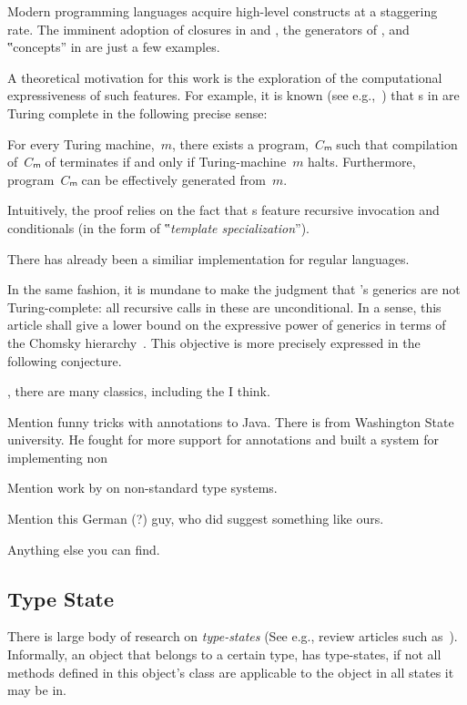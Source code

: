 Modern programming languages acquire high-level constructs
  at a staggering rate.
The imminent adoption of closures in \Java and \CC,
  the generators of \CSharp, and ‟concepts” in
  \CC are just a few examples.

A theoretical motivation for this work
  is the exploration of the computational
  expressiveness of such features.
For example, it is known (see e.g.,~\cite{Gutterman:2003}) that
  s in \CC are Turing complete in the following precise sense:

\begin{Theorem}
  \label{Theorem:Gutterman}
  For every Turing machine,~$m$, there exists a \CC program,~$Cₘ$ such that
    compilation of~$Cₘ$ of terminates if and only if
      Turing-machine~$m$ halts.
  Furthermore, program~$Cₘ$ can be effectively generated from~$m$.
\end{Theorem}

Intuitively, the proof relies on the fact that s
  feature recursive invocation and conditionals (in the form of
  ‟\emph{template specialization}”).

There has already been a similiar \Java implementation for regular
  languages.
  
In the same fashion, it is mundane to make the judgment that
  \Java's generics are not Turing-complete: all recursive calls
  in these are unconditional.
In a sense, this article shall give a lower bound on the
  expressive power of \Java generics in terms of the Chomsky hierarchy~\cite{Chomsky:1963}.
This objective is more precisely expressed in the following conjecture.

\cite{Mention:all:C++:template:programming}, there are many classics, including the \cite{Abrahams:Gurtovoy:04} I think. 

Mention funny tricks with annotations to Java. There is \cite{Michael:Earnst} from 
  Washington State university. He fought for more support for annotations 
  and built a system for implementing non

Mention work by \cite{Bracha} on non-standard type systems.  

Mention this German (?) guy, who did suggest something like ours.  

Anything else you can find.

\subsection{Type State}
There is large body of research on \emph{type-states} (See e.g., review articles such
  as~\cite{Aldrich:Sunshine:2009,Bierhoff:Aldrich:2005}).
Informally, an object that belongs to a certain type, has
type-states, if not all methods defined in this object's class are applicable
to the object in all states it may be in.

